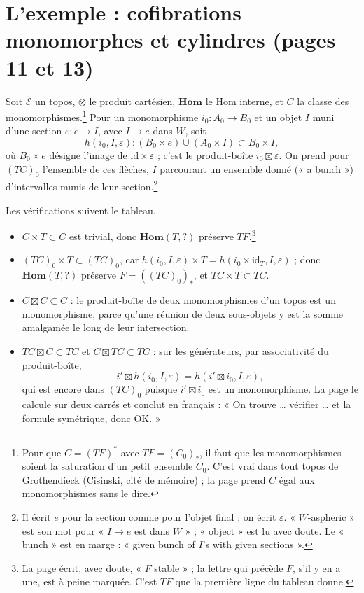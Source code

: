 \documentclass[11pt,a4paper]{article}
\begin{document}
\section*{L'exemple : cofibrations monomorphes et cylindres (pages 11 et 13)}

Soit $\mathcal{E}$ un topos, $\otimes$ le produit cartésien, $\mathbf{Hom}$ le
$\mathrm{Hom}$ interne, et $C$ la classe des monomorphismes.\footnote{Pour que
$C = (TF)^*$ avec $TF = (C_0)_*$, il faut que les monomorphismes soient la
saturation d'un petit ensemble $C_0$. C'est vrai dans tout topos de
Grothendieck (Cisinski, cité de mémoire) ; la page prend $C$ égal aux
monomorphismes sans le dire.} Pour un monomorphisme $i_0 : A_0 \to B_0$ et un
objet $I$ muni d'une section $\varepsilon : e \to I$, avec $I \to e$ dans $W$,
soit
\[
h(i_0, I, \varepsilon) : (B_0 \times e) \cup (A_0 \times I)
\subset B_0 \times I ,
\]
où $B_0 \times e$ désigne l'image de $\mathrm{id} \times \varepsilon$ ;
c'est le produit-boîte $i_0 \boxtimes \varepsilon$. On prend pour $(TC)_0$
l'ensemble de ces flèches, $I$ parcourant un ensemble donné (« a bunch »)
d'intervalles munis de leur section.\footnote{Il écrit $e$ pour la section
comme pour l'objet final ; on écrit $\varepsilon$. « $W$-aspheric » est son
mot pour « $I \to e$ est dans $W$ » ; « object » est lu avec doute. Le
« bunch » est en marge : « given bunch of $I$'s with given sections ».}

Les vérifications suivent le tableau.
\begin{itemize}
\item $C \times T \subset C$ est trivial, donc $\mathbf{Hom}(T, ?)$ préserve
$TF$.\footnote{La page écrit, avec doute, « $F$ stable » ; la lettre qui
précède $F$, s'il y en a une, est à peine marquée. C'est $TF$ que la première
ligne du tableau donne.}
\item $(TC)_0 \times T \subset (TC)_0$, car $h(i_0, I, \varepsilon) \times T =
h(i_0 \times \mathrm{id}_T, I, \varepsilon)$ ; donc $\mathbf{Hom}(T, ?)$
préserve $F = ((TC)_0)_*$, et $TC \times T \subset TC$.
\item $C \boxtimes C \subset C$ : le produit-boîte de deux monomorphismes d'un
topos est un monomorphisme, parce qu'une réunion de deux sous-objets y est la
somme amalgamée le long de leur intersection.
\item $TC \boxtimes C \subset TC$ et $C \boxtimes TC \subset TC$ : sur les
générateurs, par associativité du produit-boîte,
\[
i' \boxtimes h(i_0, I, \varepsilon) = h(i' \boxtimes i_0, I, \varepsilon),
\]
qui est encore dans $(TC)_0$ puisque $i' \boxtimes i_0$ est un
monomorphisme. La page le calcule sur deux carrés et conclut en
français : « On trouve … vérifier … et la formule symétrique, donc OK. »
\end{itemize}
\end{document}
